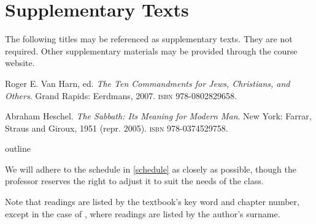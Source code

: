 \documentclass[titlepage]{article}
\begin{document}
\section{Supplementary Texts}
\label{supplementary}

The following titles may be referenced as supplementary texts. They are
not required. Other supplementary materials may be provided through the
course website.

\begingroup
\renewcommand{\section}[2]{}%
\begin{thebibliography}{3}%

	 Roger E. Van Harn, ed.
	\emph{The Ten Commandments for Jews, Christians, and Others}.
	Grand Rapids: Eerdmans, 2007.
	\textsc{isbn} 978-0802829658.

	 Abraham Heschel.
	\emph{The Sabbath: Its Meaning for Modern Man}.
	New York: Farrar, Straus and Giroux, 1951 (repr. 2005).
	\textsc{isbn} 978-0374529758.

\end{thebibliography}
\endgroup

\section{Course Outline}
\label{outline}

We will adhere to the schedule in \autoref{schedule} as closely as
possible, though the professor reserves the right to adjust it to suit
the needs of the class.

Note that readings are listed by the textbook's key word and chapter
number, except in the case of \cite{Reflections}, where readings are
listed by the author's surname.
\end{document}
